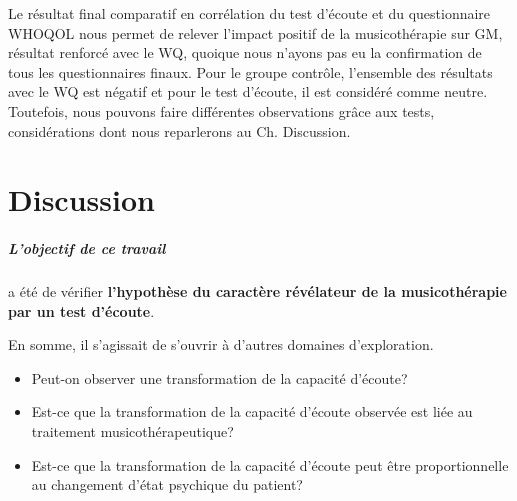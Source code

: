   Le résultat final comparatif en corrélation du test d'écoute et du questionnaire WHOQOL nous permet
  de relever l'impact positif de la
  musicothérapie sur GM, résultat renforcé
  avec le WQ, quoique  nous n'ayons pas eu la confirmation de tous les questionnaires finaux.
  Pour le groupe contrôle, l'ensemble des résultats avec le WQ est
  négatif et pour le
  test d'écoute, il est considéré comme neutre. Toutefois, nous pouvons faire différentes observations  
  grâce aux tests, considérations dont nous reparlerons au Ch. Discussion.
  
  
 
\chapter{Discussion}
\label{Conclusions}



 
\paragraph{L'objectif de ce travail} a été de vérifier\textbf{ l'hypothèse du caractère
	révélateur de la musicothérapie par un  test
	d'écoute}. %
	
En somme, il s'agissait   
de s'ouvrir à d'autres
domaines d'exploration.


 


\begin{itemize}
	
	\item Peut-on observer une transformation de la capacité d'écoute?
	\item Est-ce que la transformation de la capacité d'écoute observée est liée
	au traitement musicothérapeutique?
	\item Est-ce que la transformation de la capacité d'écoute peut être proportionnelle au 
	changement d'état psychique du patient?
\end{itemize}


